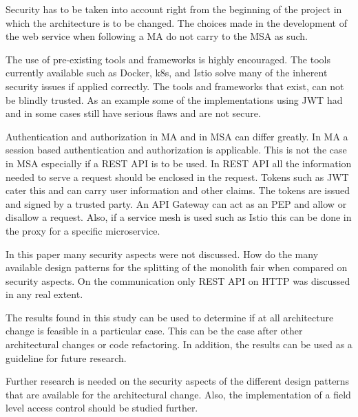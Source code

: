\begin{sloppypar}
    Security has to be taken into account right from the beginning of the
    project in which the architecture is to be changed. The choices made in the
    development of the web service when following a MA do not carry to the MSA
    as such.
\end{sloppypar}
\begin{sloppypar}
    The use of pre-existing tools and frameworks is highly encouraged. The tools
    currently available such as Docker, k8s, and Istio solve many of the
    inherent security issues if applied correctly. The tools and frameworks that
    exist, can not be blindly trusted. As an example some of the implementations
    using JWT had and in some cases still have serious flaws and are not secure.
\end{sloppypar}
\begin{sloppypar}
    Authentication and authorization in MA and in MSA can differ greatly. In MA
    a session based authentication and authorization is applicable. This is not
    the case in MSA especially if a REST API is to be used. In REST API all the
    information needed to serve a request should be enclosed in the request.
    Tokens such as JWT cater this and can carry user information and other
    claims. The tokens are issued and signed by a trusted party. An API Gateway
    can act as an PEP and allow or disallow a request. Also, if a service mesh
    is used such as Istio this can be done in the proxy for a specific
    microservice.
\end{sloppypar}
\begin{sloppypar}
    In this paper many security aspects were not discussed. How do the many
    available design patterns for the splitting of the monolith fair when
    compared on security aspects. On the communication only REST API on HTTP was
    discussed in any real extent. 
\end{sloppypar}
\begin{sloppypar}
    The results found in this study can be used to determine if at all
    architecture change is feasible in a particular case. This can be the case
    after other architectural changes or code refactoring. In addition, the
    results can be used as a guideline for future research.
\end{sloppypar}
\begin{sloppypar}
    Further research is needed on the security aspects of the different design
    patterns that are available for the architectural change. Also, the
    implementation of a field level access control should be studied further.
\end{sloppypar}

